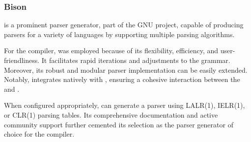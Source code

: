 \subsubsection{Bison}

\parserGen{} is a prominent parser generator, part of the GNU project, capable of
producing parsers for a variety of languages by supporting multiple parsing
algorithms\cite{BISON}. 

For the \lang{} compiler, \parserGen{} was employed because of its flexibility,
efficiency, and user-friendliness. It facilitates rapid iterations and adjustments to
the grammar. Moreover, its robust and modular parser implementation can be easily
extended. Notably, \parserGen{} integrates natively with \lexerGen{}, ensuring a
cohesive interaction between the \lexer{} and \parser{}.

When configured appropriately, \parserGen{} can generate a \textit{\parserType{}}
parser using LALR(1), IELR(1), or CLR(1) parsing tables. Its comprehensive
documentation and active community support further cemented its selection as the
parser generator of choice for the \lang{} compiler.
